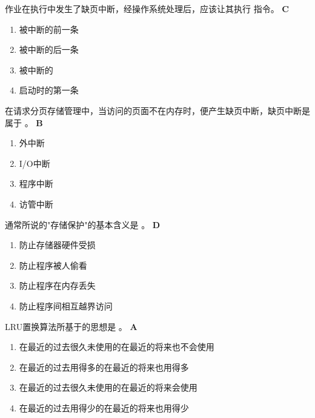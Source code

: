 \begin{problem}
	作业在执行中发生了缺页中断，经操作系统处理后，应该让其执行 \myline 指令。
	\textbf{C}
	\vspace{-0.5em}
	\begin{multicols}{4}
		\begin{enumerate}[label=\Alph*.]
			\item 被中断的前一条
			\item 被中断的后一条
			\item 被中断的
			\item 启动时的第一条
		\end{enumerate}
	\end{multicols}
	\vspace{-1em}
\end{problem}


\begin{problem}
	在请求分页存储管理中，当访问的页面不在内存时，便产生缺页中断，缺页中断是属于 \myline。
	\textbf{B}
	\vspace{-0.5em}
	\begin{multicols}{4}
		\begin{enumerate}[label=\Alph*.]
			\item 外中断
			\item I/O中断
			\item 程序中断
			\item 访管中断
		\end{enumerate}
	\end{multicols}
	\vspace{-1em}
\end{problem}


\begin{problem}
	通常所说的"存储保护"的基本含义是 \myline。
	\textbf{D}
	\vspace{-0.5em}
	\begin{multicols}{2}
		\begin{enumerate}[label=\Alph*.]
			\item 防止存储器硬件受损
			\item 防止程序被人偷看
			\item 防止程序在内存丢失
			\item 防止程序间相互越界访问
		\end{enumerate}
	\end{multicols}
	\vspace{-1em}
\end{problem}


\begin{problem}
	LRU置换算法所基于的思想是 \myline。
	\textbf{A}
		\begin{enumerate}[label=\Alph*.]
			\item 在最近的过去很久未使用的在最近的将来也不会使用
			\item 在最近的过去用得多的在最近的将来也用得多
			\item 在最近的过去很久未使用的在最近的将来会使用
			\item 在最近的过去用得少的在最近的将来也用得少
		\end{enumerate}
\end{problem}



